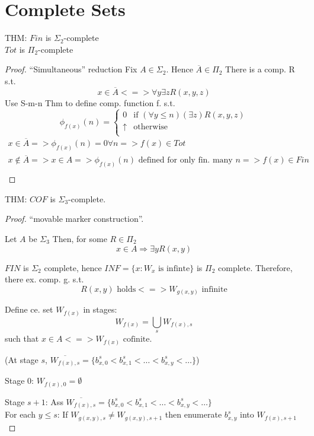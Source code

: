 \documentclass[12pt]{article}
\newcommand{\Conj}[1]{\ensuremath{\overline{#1}}}
\begin{document}
\section*{Complete Sets}
THM: $Fin$ is $\Sigma_2$-complete \\
$Tot$ is $\Pi_2$-complete
\begin{proof}
 ``Simultaneous'' reduction
	Fix $ A \in \Sigma_2$. Hence $\Conj{A} \in \Pi_2$
	There is a comp. R s.t.
\[
 x \in \Conj{A} <=> \forall y \exists z R(x,y,z)
\]
Use S-m-n Thm to define comp. function f. s.t. 
\[
 \phi_{f(x)}(n) = \begin{cases}
                   0		&\text{if } (\forall y \le n) (\exists z) R(x,y,z) \\
                   \uparrow	&\text{otherwise}\\
                  \end{cases}
\]
\begin{align*}
 x \in \Conj{A} => \phi_{f(x)}(n) = 0 \forall n => f(x) \in Tot \\
 x \not\in \Conj{A} => x \in A => 
\phi_{f(x)}(n) \text{ defined for only fin. many $n$} => f(x) \in Fin \\
\end{align*}
\end{proof}

THM: $COF$ is $\Sigma_3$-complete.
\begin{proof} ``movable marker construction''.

Let $A$ be $\Sigma_3$  Then, for some $R \in \Pi_2$
\[ x\in A \Rightarrow \exists y R(x,y) \]

$FIN$ is $\Sigma_2$ complete, hence $INF = \{x : W_x \text{ is infinte} \}$ is
$\Pi_2$ complete.  Therefore, there ex. comp. g. s.t.
\[
 R(x,y) \text{ holds} <=> W_{g(x,y)} \text{ infinite}
\]

Define ce. set $W_{f(x)}$ in stages:
\[
 W_{f(x)} = \bigcup_s W_{f(x),s}
\]
such that
$x \in A <=> W_{f(x)} \text{ cofinite.}$

(At stage $s$,
$
 \Conj{W_{f(x),s}} = \{ b^s_{x,0} < b^s_{x,1} < \ldots < b^s_{x,y} < \ldots \}
$)

Stage 0: $W_{f(x),0} = \emptyset$

Stage $s+1$:  Ass  $\Conj{W_{f(x),s}} = \{ b^s_{x,0} < b^s_{x,1} < \ldots < b^s_{x,y} < \ldots \}$ \\
For each $y \le s$:
If $W_{g(x,y),s} \ne W_{g(x,y),s+1}$
then enumerate $b^s_{x,y}$ into $W_{f(x),s+1}$


\end{proof}
\end{document}
